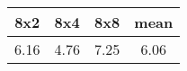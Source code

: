 \begin{tabular}{|c|c|c|c|}
\hline
\textbf{8x2}&\textbf{8x4}&\textbf{8x8}&\textbf{mean}\\\hline
6.16&4.76&7.25&6.06\\\hline
\end{tabular}
